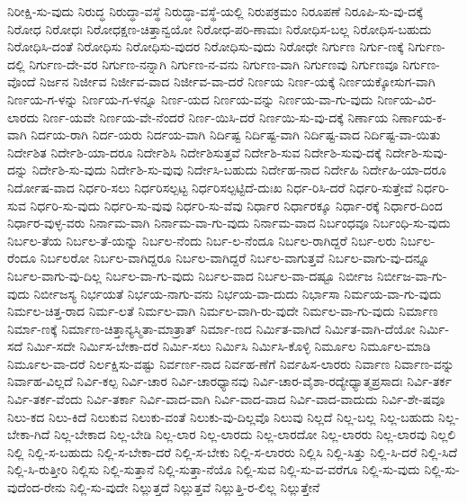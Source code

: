 {ನಿರೀಕ್ಷಿ-ಸು-ವುದು
ನಿರುದ್ಧ
ನಿರುದ್ಧಾ-ವಸ್ಥೆ
ನಿರುದ್ಧಾ-ವಸ್ಥೆ-ಯಲ್ಲಿ
ನಿರುಪಕ್ರಮಂ
ನಿರೂಪಣೆ
ನಿರೂಪಿ-ಸು-ವು-ದಕ್ಕೆ
ನಿರೋಧ
ನಿರೋಧಃ
ನಿರೋಧಕ್ಷಣ-ಚಿತ್ತಾನ್ವಯೋ
ನಿರೋಧ-ಪರಿ-ಣಾಮಃ
ನಿರೋಧಿಸ-ಬಲ್ಲ
ನಿರೋಧಿಸ-ಬಹುದು
ನಿರೋಧಿಸಿ-ದಂತೆ
ನಿರೋಧಿಸು
ನಿರೋಧಿಸು-ವುದರ
ನಿರೋಧಿಸು-ವುದು
ನಿರೋಧೇ
ನಿರ್ಗುಣ
ನಿರ್ಗು-ಣಕ್ಕೆ
ನಿರ್ಗುಣ-ದಲ್ಲಿ
ನಿರ್ಗುಣ-ದೇ-ವರ
ನಿರ್ಗುಣ-ನನ್ನಾಗಿ
ನಿರ್ಗುಣ-ನ-ವನು
ನಿರ್ಗುಣ-ವಾಗಿ
ನಿರ್ಗುಣವು
ನಿರ್ಗುಣವೂ
ನಿರ್ಗುಣ-ವೊಂದೆ
ನಿರ್ಜನ
ನಿರ್ಜೀವ
ನಿರ್ಜೀವ-ವಾದ
ನಿರ್ಜೀವ-ವಾ-ದರೆ
ನಿರ್ಣಯ
ನಿರ್ಣ-ಯಕ್ಕೆ
ನಿರ್ಣಯಕ್ಕೋಸುಗ-ವಾಗಿ
ನಿರ್ಣಯ-ಗ-ಳನ್ನು
ನಿರ್ಣಯ-ಗ-ಳನ್ನೂ
ನಿರ್ಣ-ಯದ
ನಿರ್ಣಯ-ವನ್ನು
ನಿರ್ಣಯ-ವಾ-ಗು-ವುದು
ನಿರ್ಣಯ-ವಿರ-ಲಾರದು
ನಿರ್ಣ-ಯವೇ
ನಿರ್ಣಯ-ವೇ-ನೆಂದರೆ
ನಿರ್ಣ-ಯಿಸಿ-ದರೆ
ನಿರ್ಣಯಿ-ಸು-ವು-ದಕ್ಕೆ
ನಿರ್ಣಾಯ
ನಿರ್ಣಾಯ-ಕ-ವಾಗಿ
ನಿರ್ದಯ-ರಾಗಿ
ನಿರ್ದ-ಯರು
ನಿರ್ದಯ-ವಾಗಿ
ನಿರ್ದಿಷ್ಟ
ನಿರ್ದಿಷ್ಟ-ವಾಗಿ
ನಿರ್ದಿಷ್ಟ-ವಾದ
ನಿರ್ದಿಷ್ಟ-ವಾ-ಯಿತು
ನಿರ್ದೇಶಿತ
ನಿರ್ದೇಶಿ-ಯಾ-ದರೂ
ನಿರ್ದೇಶಿಸಿ
ನಿರ್ದೇಶಿಸುತ್ತವೆ
ನಿರ್ದೇಶಿ-ಸುವ
ನಿರ್ದೇಶಿ-ಸುವು-ದಕ್ಕೆ
ನಿರ್ದೇಶಿ-ಸುವು-ದನ್ನು
ನಿರ್ದೇಶಿ-ಸು-ವುದು
ನಿರ್ದೇಶಿ-ಸು-ವುವು
ನಿರ್ದೇಸಿ-ಬಹುದು
ನಿರ್ದೇಹ-ನಾದ
ನಿರ್ದೇಹಿ
ನಿರ್ದೇಹಿ-ಯಾ-ದರೂ
ನಿರ್ದೋಷ-ವಾದ
ನಿರ್ಧರಿ-ಸಲು
ನಿರ್ಧರಿಸಲ್ಪಟ್ಟ
ನಿರ್ಧರಿಸಲ್ಪಟ್ಟಿದೆ-ದುಃಖ
ನಿರ್ಧ-ರಿಸಿ-ದರೆ
ನಿರ್ಧರಿ-ಸುತ್ತೇವೆ
ನಿರ್ಧರಿ-ಸುವ
ನಿರ್ಧರಿ-ಸು-ವುದು
ನಿರ್ಧರಿ-ಸು-ವುವು
ನಿರ್ಧರಿ-ಸು-ವೆವು
ನಿರ್ಧಾರ
ನಿರ್ಧಾರಕ್ಕೂ
ನಿರ್ಧಾ-ರಕ್ಕೆ
ನಿರ್ಧಾರ-ದಿಂದ
ನಿರ್ಧಾರ-ವುಳ್ಳ-ವರು
ನಿರ್ನಾಮ-ವಾಗಿ
ನಿರ್ನಾಮ-ವಾ-ಗು-ವುದು
ನಿರ್ನಾಮ-ವಾದ
ನಿರ್ಬಂಧವೂ
ನಿರ್ಬಂಧಿ-ಸು-ವುದು
ನಿರ್ಬಲ-ತೆಯ
ನಿರ್ಬಲ-ತೆ-ಯನ್ನು
ನಿರ್ಬಲ-ನೆಂದು
ನಿರ್ಬ-ಲ-ನೆಂದೂ
ನಿರ್ಬಲ-ರಾಗಿದ್ದರೆ
ನಿರ್ಬ-ಲರು
ನಿರ್ಬಲ-ರೆಂದೂ
ನಿರ್ಬಲರೋ
ನಿರ್ಬಲ-ವಾಗಿದ್ದರೂ
ನಿರ್ಬಲ-ವಾಗಿದ್ದರೆ
ನಿರ್ಬಲ-ವಾಗುತ್ತವೆ
ನಿರ್ಬಲ-ವಾಗು-ವು-ದನ್ನೂ
ನಿರ್ಬಲ-ವಾಗು-ವು-ದಿಲ್ಲ
ನಿರ್ಬಲ-ವಾ-ಗು-ವುದು
ನಿರ್ಬಲ-ವಾದ
ನಿರ್ಬಲ-ವಾ-ದಷ್ಟೂ
ನಿರ್ಬೀಜ
ನಿರ್ಬೀಜ-ವಾ-ಗು-ವುದು
ನಿರ್ಬೀಜಸ್ಯ
ನಿರ್ಭಯತೆ
ನಿರ್ಭಯ-ನಾಗು-ವನು
ನಿರ್ಭಯ-ವಾ-ದುದು
ನಿರ್ಭಾಸಾ
ನಿರ್ಮಯ-ವಾ-ಗು-ವುದು
ನಿರ್ಮಲ-ಚಿತ್ತ-ರಾದ
ನಿರ್ಮ-ಲತೆ
ನಿರ್ಮಲ-ವಾಗಿ
ನಿರ್ಮಲ-ವಾಗಿ-ರು-ವುದೇ
ನಿರ್ಮಲ-ವಾ-ಗು-ವುದು
ನಿರ್ಮಾಣ
ನಿರ್ಮಾ-ಣಕ್ಕೆ
ನಿರ್ಮಾಣ-ಚಿತ್ತಾನ್ಯಸ್ಮಿತಾ-ಮಾತ್ರಾತ್
ನಿರ್ಮಾ-ಣದ
ನಿರ್ಮಿತ-ವಾಗಿದೆ
ನಿರ್ಮಿತ-ವಾಗಿ-ದೆಯೋ
ನಿರ್ಮಿ-ಸದೆ
ನಿರ್ಮಿ-ಸದೇ
ನಿರ್ಮಿಸ-ಬೇಕಾ-ದರೆ
ನಿರ್ಮಿ-ಸಲು
ನಿರ್ಮಿಸಿ
ನಿರ್ಮಿಸಿ-ಕೊಳ್ಳಿ
ನಿರ್ಮೂಲ
ನಿರ್ಮೂಲ-ಮಾಡಿ
ನಿರ್ಮೂಲ-ವಾ-ದರೆ
ನಿರ್ಲಕ್ಷಿಸು-ವಷ್ಟು
ನಿರ್ವರ್ಣ-ನಾದ
ನಿರ್ವಹ-ಣೆಗೆ
ನಿರ್ವಹಿಸ-ಲಾರರು
ನಿರ್ವಾಣ
ನಿರ್ವಾಣ-ವನ್ನು
ನಿರ್ವಾಹ-ವಿಲ್ಲದೆ
ನಿರ್ವಿ-ಕಲ್ಪ
ನಿರ್ವಿ-ಚಾರ
ನಿರ್ವಿ-ಚಾರಧ್ಯಾನವು
ನಿರ್ವಿ-ಚಾರ-ವೈಶಾ-ರದ್ಯೇಧ್ಯಾತ್ಮಪ್ರಸಾದಃ
ನಿರ್ವಿ-ತರ್ಕ
ನಿರ್ವಿ-ತರ್ಕ-ವೆಂದು
ನಿರ್ವಿ-ತರ್ಕಾ
ನಿರ್ವಿ-ವಾದ-ವಾಗಿ
ನಿರ್ವಿ-ವಾದ-ವಾದ
ನಿರ್ವಿ-ವಾದ-ವಾದುದು
ನಿರ್ವಿ-ಶೇ-ಷವೂ
ನಿಲು-ಕದ
ನಿಲು-ಕಿದೆ
ನಿಲುಕುವ
ನಿಲುಕು-ವಂತೆ
ನಿಲುಕು-ವು-ದಿಲ್ಲವೊ
ನಿಲುವು
ನಿಲ್ಲದೆ
ನಿಲ್ಲ-ಬಲ್ಲ
ನಿಲ್ಲ-ಬಹುದು
ನಿಲ್ಲ-ಬೇಕಾ-ಗಿದೆ
ನಿಲ್ಲ-ಬೇಕಾದ
ನಿಲ್ಲ-ಬೇಡಿ
ನಿಲ್ಲ-ಲಾರ
ನಿಲ್ಲ-ಲಾರದು
ನಿಲ್ಲ-ಲಾರದೋ
ನಿಲ್ಲ-ಲಾರರು
ನಿಲ್ಲ-ಲಾರವು
ನಿಲ್ಲಲಿ
ನಿಲ್ಲಿ
ನಿಲ್ಲಿ-ಸ-ಬಹುದು
ನಿಲ್ಲಿ-ಸ-ಬೇಕಾ-ದರೆ
ನಿಲ್ಲಿ-ಸ-ಬೇಕು
ನಿಲ್ಲಿ-ಸ-ಲಾರರು
ನಿಲ್ಲಿಸಿ
ನಿಲ್ಲಿ-ಸಿತ್ತು
ನಿಲ್ಲಿ-ಸಿ-ದರೆ
ನಿಲ್ಲಿ-ಸಿದೆ
ನಿಲ್ಲಿ-ಸಿ-ರುತ್ತೀರಿ
ನಿಲ್ಲಿಸು
ನಿಲ್ಲಿ-ಸುತ್ತಾನೆ
ನಿಲ್ಲಿ-ಸುತ್ತಾ-ನೆಯೊ
ನಿಲ್ಲಿ-ಸುವ
ನಿಲ್ಲಿ-ಸು-ವ-ವರೆಗೂ
ನಿಲ್ಲಿ-ಸು-ವುದು
ನಿಲ್ಲಿ-ಸು-ವುದೆಂದ-ರೇನು
ನಿಲ್ಲಿ-ಸು-ವುದೇ
ನಿಲ್ಲುತ್ತದೆ
ನಿಲ್ಲುತ್ತವೆ
ನಿಲ್ಲುತ್ತಿ-ರ-ಲಿಲ್ಲ
ನಿಲ್ಲುತ್ತೇನೆ
}
